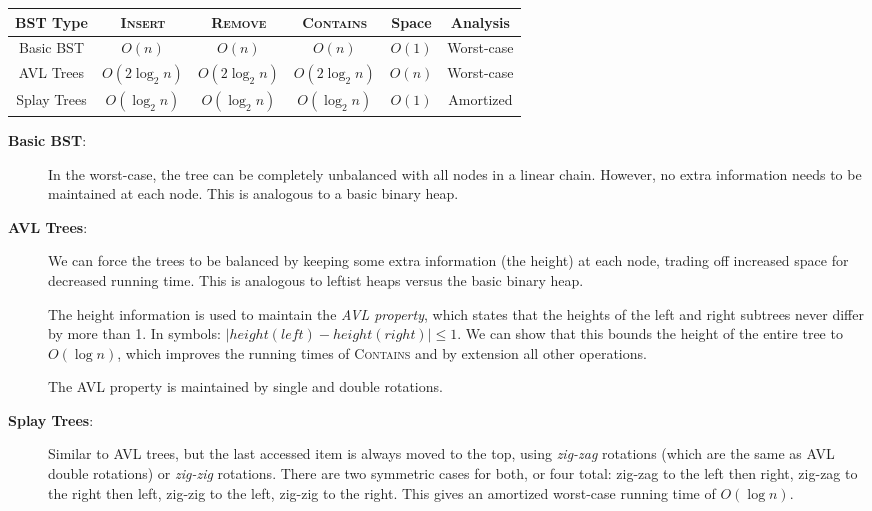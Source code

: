 \documentclass{article}[10pth]
\begin{document}
\begin{center}
\begin{tabular}{|c|c|c|c|c|c|}
\hline
\textbf{BST Type} & \textbf{\textsc{Insert}} & \textbf{\textsc{Remove}} & \textbf{\textsc{Contains}} & \textbf{Space} & \textbf{Analysis}\\
\hline
Basic BST & $O(n)$ & $O(n)$ & $O(n)$ & $O(1)$ & Worst-case\\
AVL Trees & $O(2\log_2{n})$ & $O(2\log_2{n})$ & $O(2\log_2{n})$ & $O(n)$ & Worst-case\\
Splay Trees & $O(\log_2{n})$ & $O(\log_2{n})$ & $O(\log_2{n})$ & $O(1)$ & Amortized \\
\hline
\end{tabular}
\end{center}

\begin{description}
\item[\textbf{Basic BST}:] In the worst-case, the tree can be completely
unbalanced with all nodes in a linear chain. However, no extra information
needs to be maintained at each node. This is analogous to a basic
binary heap.

\item[\textbf{AVL Trees}:] 
We can force the trees to be balanced by keeping some extra information
(the height) at each node, trading off increased space for decreased
running time. This is analogous to leftist heaps versus the basic binary
heap.

The height information is used to maintain the
\textit{AVL property}, which states that the heights of the left and
right subtrees never differ by more than 1. In symbols:
$|height(left) - height(right)| \le 1$. We can show that this
bounds the height of the entire tree to $O(\log{n})$, which improves
the running times of \textsc{Contains} and by extension all other
operations.

The AVL property is maintained by single and double rotations.

\item[\textbf{Splay Trees}:] Similar to AVL trees, but the last accessed item
is always moved to the top, using \textit{zig-zag} rotations (which are the
same as AVL double rotations) or \textit{zig-zig} rotations. There are
two symmetric cases for both, or four total:
zig-zag to the left then right, zig-zag to the
right then left, zig-zig to the left, zig-zig to the right.
This gives an amortized worst-case running time of $O(\log{n})$.

\end{description}
\end{document}
